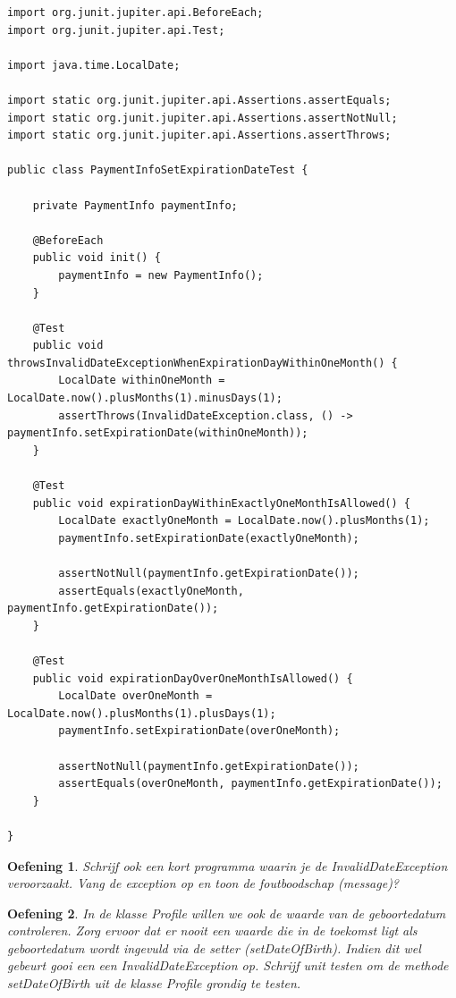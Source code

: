 \documentclass{tstextbook}
\newtheorem{envoefening}{Oefening}[chapter]
\newenvironment{oefening}
               {\begin{boxexercise}\begin{envoefening}}
               {\end{envoefening}\end{boxexercise}}
\begin{document}
\begin{lstlisting}
import org.junit.jupiter.api.BeforeEach;
import org.junit.jupiter.api.Test;

import java.time.LocalDate;

import static org.junit.jupiter.api.Assertions.assertEquals;
import static org.junit.jupiter.api.Assertions.assertNotNull;
import static org.junit.jupiter.api.Assertions.assertThrows;

public class PaymentInfoSetExpirationDateTest {

	private PaymentInfo paymentInfo;

	@BeforeEach
	public void init() {
		paymentInfo = new PaymentInfo();
	}

	@Test
	public void throwsInvalidDateExceptionWhenExpirationDayWithinOneMonth() {
		LocalDate withinOneMonth = LocalDate.now().plusMonths(1).minusDays(1);
		assertThrows(InvalidDateException.class, () -> paymentInfo.setExpirationDate(withinOneMonth));
	}

	@Test
	public void expirationDayWithinExactlyOneMonthIsAllowed() {
		LocalDate exactlyOneMonth = LocalDate.now().plusMonths(1);
		paymentInfo.setExpirationDate(exactlyOneMonth);

		assertNotNull(paymentInfo.getExpirationDate());
		assertEquals(exactlyOneMonth, paymentInfo.getExpirationDate());
	}

	@Test
	public void expirationDayOverOneMonthIsAllowed() {
		LocalDate overOneMonth = LocalDate.now().plusMonths(1).plusDays(1);
		paymentInfo.setExpirationDate(overOneMonth);

		assertNotNull(paymentInfo.getExpirationDate());
		assertEquals(overOneMonth, paymentInfo.getExpirationDate());
	}

}
\end{lstlisting} 

\begin{oefening}
Schrijf ook een kort programma waarin je de InvalidDateException veroorzaakt. Vang de exception op en toon de foutboodschap (message)?
\end{oefening}

\begin{oefening}
In de klasse Profile willen we ook de waarde van de geboortedatum controleren. Zorg ervoor dat er nooit een waarde die in de toekomst ligt als geboortedatum wordt ingevuld via de setter (setDateOfBirth). Indien dit wel gebeurt gooi een een InvalidDateException op. Schrijf unit testen om de methode setDateOfBirth uit de klasse Profile grondig te testen.
\end{oefening}
 
\end{document}
